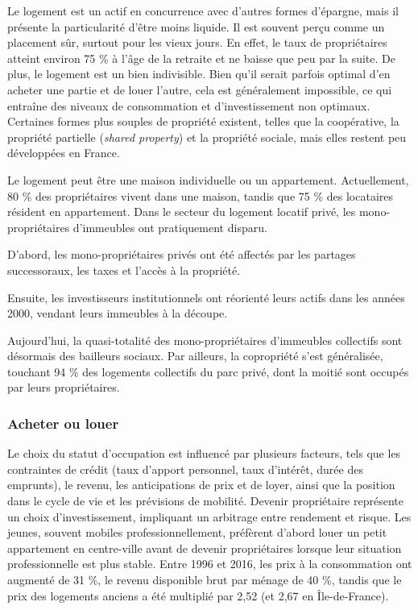 \documentclass[a4paper, 12pt]{report}
\begin{document}
Le logement est un actif en concurrence avec d'autres formes d’épargne, mais il présente la particularité d'être moins liquide. Il est souvent perçu comme un placement sûr, surtout pour les vieux jours. En effet, le taux de propriétaires atteint environ 75 \% à l’âge de la retraite et ne baisse que peu par la suite. De plus, le logement est un bien indivisible. Bien qu'il serait parfois optimal d'en acheter une partie et de louer l'autre, cela est généralement impossible, ce qui entraîne des niveaux de consommation et d’investissement non optimaux. Certaines formes plus souples de propriété existent, telles que la coopérative, la propriété partielle (\textit{shared property}) et la propriété sociale, mais elles restent peu développées en France.

Le logement peut être une maison individuelle ou un appartement. Actuellement, 80 \% des propriétaires vivent dans une maison, tandis que 75 \% des locataires résident en appartement. Dans le secteur du logement locatif privé, les mono-propriétaires d’immeubles ont pratiquement disparu. 

D'abord, les mono-propriétaires privés ont été affectés par les partages successoraux, les taxes et l’accès à la propriété. 

Ensuite, les investisseurs institutionnels ont réorienté leurs actifs dans les années 2000, vendant leurs immeubles à la découpe. 

Aujourd'hui, la quasi-totalité des mono-propriétaires d’immeubles collectifs sont désormais des bailleurs sociaux. Par ailleurs, la copropriété s’est généralisée, touchant 94 \% des logements collectifs du parc privé, dont la moitié sont occupés par leurs propriétaires.

\subsubsection{Acheter ou louer}

Le choix du statut d’occupation est influencé par plusieurs facteurs, tels que les contraintes de crédit (taux d’apport personnel, taux d’intérêt, durée des emprunts), le revenu, les anticipations de prix et de loyer, ainsi que la position dans le cycle de vie et les prévisions de mobilité. Devenir propriétaire représente un choix d’investissement, impliquant un arbitrage entre rendement et risque. Les jeunes, souvent mobiles professionnellement, préfèrent d’abord louer un petit appartement en centre-ville avant de devenir propriétaires lorsque leur situation professionnelle est plus stable. Entre 1996 et 2016, les prix à la consommation ont augmenté de 31 \%, le revenu disponible brut par ménage de 40 \%, tandis que le prix des logements anciens a été multiplié par 2,52 (et 2,67 en Île-de-France).
\end{document}
